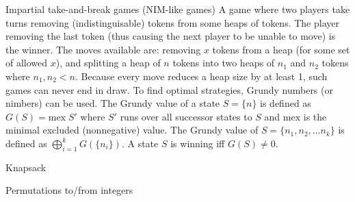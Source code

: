 \clearpage
{}
\categorycontents{}



\begin{algorithm}{Impartial take-and-break games (NIM-like games)}
\desc
A game where two players take turns removing (indistinguisable) tokens
from some heaps of tokens.  The player removing the last token (thus
causing the next player to be unable to move) is the winner.  The
moves available are: removing $x$ tokens from a heap (for some set of
allowed $x$), and splitting a heap of $n$ tokens into two heaps of
$n_1$ and $n_2$ tokens where $n_1, n_2 < n$.  Because every move
reduces a heap size by at least 1, such games can never end in draw.
To find optimal strategies, Grundy numbers (or nimbers) can be used.
The Grundy value of a state $S = \{n\}$ is defined as $G(S) =
\mathrm{mex}\;S'$ where $S'$ runs over all successor states to $S$ and
$\mathrm{mex}$ is the minimal excluded (nonnegative) value.  The
Grundy value of $S =
\{n_1, n_2, \ldots n_k\}$ is defined as $\bigoplus_{i=1}^{k}
G(\{n_i\})$.  A state $S$ is winning iff $G(S) \ne 0$.

\end{algorithm}


\begin{algorithm}{Knapsack}
\end{algorithm}




\begin{algorithm}{Permutations to/from integers}
\end{algorithm}



